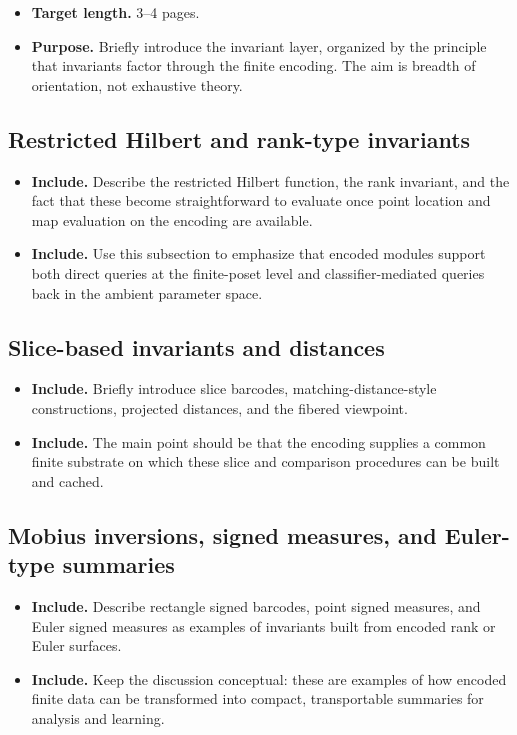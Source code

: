 \documentclass[11pt]{article}
\newenvironment{plan}{\begin{itemize}[leftmargin=1.6em,itemsep=0.35em,topsep=0.25em]}{\end{itemize}}
\newcommand{\target}[1]{\item \textbf{Target length.} #1}
\newcommand{\purpose}[1]{\item \textbf{Purpose.} #1}
\newcommand{\includeitems}[1]{\item \textbf{Include.} #1}
\begin{document}
\begin{plan}
    \target{3--4 pages.}
    \purpose{Briefly introduce the invariant layer, organized by the principle that invariants factor through the finite encoding. The aim is breadth of orientation, not exhaustive theory.}
\end{plan}

\subsection{Restricted Hilbert and rank-type invariants}

\begin{plan}
    \includeitems{Describe the restricted Hilbert function, the rank invariant, and the fact that these become straightforward to evaluate once point location and map evaluation on the encoding are available.}
    \includeitems{Use this subsection to emphasize that encoded modules support both direct queries at the finite-poset level and classifier-mediated queries back in the ambient parameter space.}
\end{plan}

\subsection{Slice-based invariants and distances}

\begin{plan}
    \includeitems{Briefly introduce slice barcodes, matching-distance-style constructions, projected distances, and the fibered viewpoint.}
    \includeitems{The main point should be that the encoding supplies a common finite substrate on which these slice and comparison procedures can be built and cached.}
\end{plan}

\subsection{Mobius inversions, signed measures, and Euler-type summaries}

\begin{plan}
    \includeitems{Describe rectangle signed barcodes, point signed measures, and Euler signed measures as examples of invariants built from encoded rank or Euler surfaces.}
    \includeitems{Keep the discussion conceptual: these are examples of how encoded finite data can be transformed into compact, transportable summaries for analysis and learning.}
\end{plan}
\end{document}
